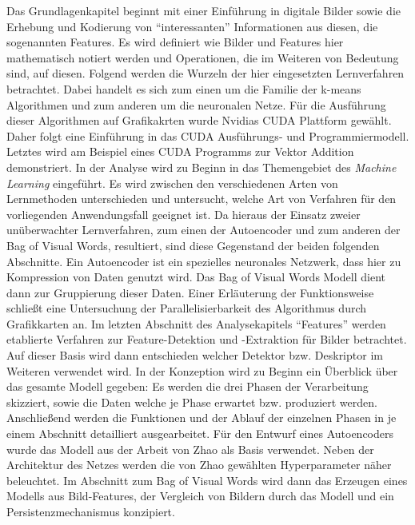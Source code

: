Das Grundlagenkapitel beginnt mit einer Einführung in digitale Bilder sowie die Erhebung und Kodierung von \enquote{interessanten} Informationen aus diesen, die sogenannten Features. Es wird definiert wie Bilder und Features hier mathematisch notiert werden und Operationen, die im Weiteren von Bedeutung sind, auf diesen. Folgend werden die Wurzeln der hier eingesetzten Lernverfahren betrachtet. Dabei handelt es sich zum einen um die Familie der k-means Algorithmen und zum anderen um die neuronalen Netze. Für die Ausführung dieser Algorithmen auf Grafikakrten wurde Nvidias CUDA Plattform gewählt. Daher folgt eine Einführung in das CUDA Ausführungs- und Programmiermodell. Letztes wird am Beispiel eines CUDA Programms zur Vektor Addition demonstriert.\newline
In der Analyse wird zu Beginn in das Themengebiet des \textit{Machine Learning} eingeführt. Es wird zwischen den verschiedenen Arten von Lernmethoden unterschieden und untersucht, welche Art von Verfahren für den vorliegenden Anwendungsfall geeignet ist. Da hieraus der Einsatz zweier unüberwachter Lernverfahren, zum einen der Autoencoder und zum anderen der Bag of Visual Words, resultiert, sind diese Gegenstand der beiden folgenden Abschnitte. Ein Autoencoder ist ein spezielles neuronales Netzwerk, dass hier zu Kompression von Daten genutzt wird. Das Bag of Visual Words Modell dient dann zur Gruppierung dieser Daten. Einer Erläuterung der Funktionsweise schließt eine Untersuchung der Parallelisierbarkeit des Algorithmus durch Grafikkarten an. Im letzten Abschnitt des Analysekapitels \enquote{Features} werden etablierte Verfahren zur Feature-Detektion und -Extraktion für Bilder betrachtet. Auf dieser Basis wird dann entschieden welcher Detektor bzw. Deskriptor im Weiteren verwendet wird. \newline
In der Konzeption wird zu Beginn ein Überblick über das gesamte Modell gegeben: Es werden die drei Phasen der Verarbeitung skizziert, sowie die Daten welche je Phase erwartet bzw. produziert werden. Anschließend werden die Funktionen und der Ablauf der einzelnen Phasen in je einem Abschnitt detailliert ausgearbeitet. Für den Entwurf eines Autoencoders wurde das Modell aus der Arbeit von Zhao \cite{aed2016} als Basis verwendet. Neben der Architektur des Netzes werden die von Zhao gewählten Hyperparameter näher beleuchtet. Im Abschnitt zum Bag of Visual Words wird dann das Erzeugen eines Modells aus Bild-Features, der Vergleich von Bildern durch das Modell und ein Persistenzmechanismus konzipiert. \newline
